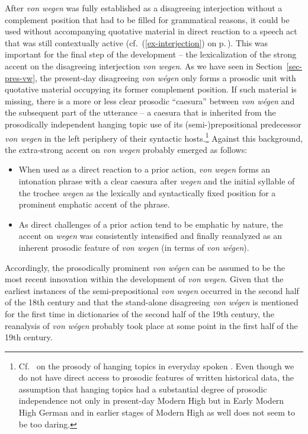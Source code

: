 \documentclass[output=paper
  ,nobabel
  ,draftmode
  ,babelshorthands
  ,colorlinks, citecolor=brown
]{langscibook}
\begin{document}
After \emph{von wegen} was fully established as a disagreeing interjection without a complement position that had to be filled for grammatical reasons, it could be used without accompanying quotative material in direct reaction to a speech act that was still contextually active (cf.\ (\ref{ex-interjection}) on p.\,\pageref{ex-interjection}). This was important for the final step of the development – the lexicalization of the strong accent on the disagreeing interjection \emph{von wegen}. As we have seen in Section~\ref{sec-pres-vw}, the present-day disagreeing \emph{von wégen} only forms a prosodic unit with quotative material occupying its former complement position. If such material is missing, there is a more or less clear prosodic ``caesura'' \citep{Auer2010,Barth-Weingarten2016}
between \emph{von wégen} and the subsequent part of the utterance -- a caesura that is inherited from the prosodically independent hanging topic use of its (semi-)prepositional predecessor \emph{von wegen} in the left periphery of their syntactic hosts.\footnote{Cf.\ \citet{Selting1993} on the prosody of hanging topics in everyday spoken . Even though we do not have direct access to prosodic features of written historical data, the assumption that hanging topics had a substantial degree of prosodic independence not only in present-day Modern High  but in Early Modern High German and in earlier stages of Modern High  as well does not seem to be too daring.}
Against this background, the extra-strong accent on \emph{von wegen} probably emerged as follows:

\begin{itemize}
    \item When used as a direct reaction to a prior action, \emph{von wegen} forms an intonation phrase with a clear caesura after \emph{wegen} and the initial syllable of the trochee \emph{wegen} as the lexically and syntactically fixed position for a prominent emphatic accent of the phrase.
    
    \item As direct challenges of a prior action tend to be emphatic by nature, the accent on \emph{wegen} was consistently intensified and finally reanalyzed as an inherent prosodic feature of \emph{von wegen} (in terms of \emph{von wégen}).
\end{itemize}

\largerpage
\noindent
Accordingly, the prosodically prominent \emph{von wégen} can be assumed to be the most recent innovation within the development of \emph{von wegen}. Given that the earliest instances of the semi-prepositional \emph{von wegen} occurred in the second half of the 18th century and that the stand-alone disagreeing \emph{von wégen} is mentioned for the first time in dictionaries of the second half of the 19th century, the reanalysis of \emph{von wégen} probably took place at some point in the first half of the 19th century.
\end{document}

